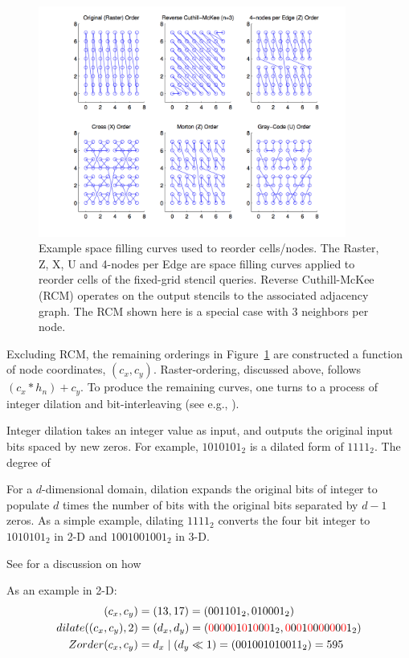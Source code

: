 \documentclass{report}
\begin{document}
\begin{figure}
\centering
\includegraphics[width=0.9\textwidth]{rbffd_methods_content/hashing/node_orderings.png} 
\caption{Example space filling curves used to reorder cells/nodes. The Raster, Z, X, U and 4-nodes per Edge are space filling curves applied to reorder cells of the fixed-grid stencil queries. Reverse Cuthill-McKee (RCM) operates on the output stencils to the associated adjacency graph. The RCM shown here is a special case with 3 neighbors per node.}
\label{fig:orderings}
\end{figure}


Excluding RCM, the remaining orderings in Figure~\ref{fig:orderings} are constructed a function of node coordinates, $(c_x,c_y)$. Raster-ordering, discussed above, follows $ (c_x * h_n) + c_y$. To produce the remaining curves, one turns to a process of integer dilation and bit-interleaving (see e.g., \cite{Mokbel2002,Stocco1995}). 

Integer dilation takes an integer value as input, and outputs the original input bits spaced by new zeros. For example, $1010101_2$ is a dilated form of $1111_2$. The degree of 


For a $d$-dimensional domain, dilation expands the original bits of integer to populate $d$ times the number of bits with the original bits separated by $d-1$ zeros. As a simple example, dilating $1111_2$ converts the four bit integer to $1010101_2$ in 2-D and $1001001001_2$ in 3-D. 

See \cite{Stocco1995} for a discussion on how 

As an example in 2-D: 
\begin{align}
(c_x,c_y) & = (13, 17) = (001101_2, 010001_2) \\
dilate((c_x,c_y), 2) & = (d_x,d_y) =  ({\color{red}0}0{\color{red}0}0{\color{red}0}1{\color{red}0}1{\color{red}0}0{\color{red}0}1_2, {\color{red}0}0{\color{red}0}1{\color{red}0}0{\color{red}0}0{\color{red}0}0{\color{red}0}1_2) \\
Zorder(c_x, c_y) & = d_x \mid (d_y \ll 1) = ( 001001010011_2 ) = 595
\end{align}
\end{document}
